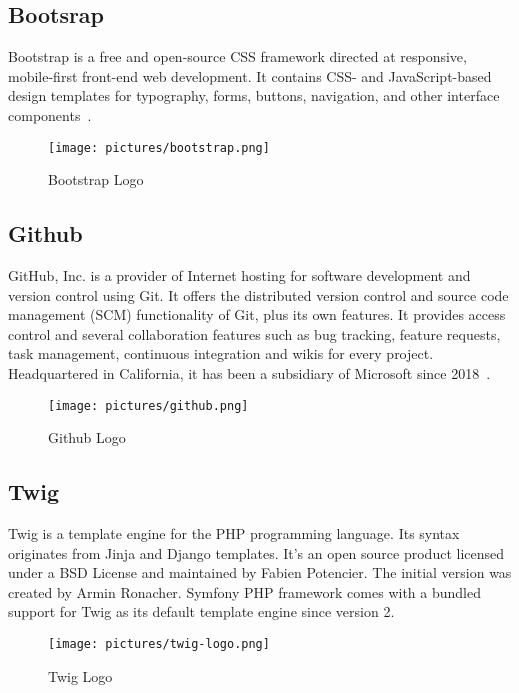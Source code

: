 \documentclass[12pt]{report}
\begin{document}
\subsection{Bootsrap}
Bootstrap is a free and open-source CSS framework directed at responsive, mobile-first front-end web development. It contains CSS- and JavaScript-based design templates for typography, forms, buttons, navigation, and other interface components~\cite{hesterberg2011bootstrap}.
\begin{figure}[!htbp]

        \centering
    \texttt{[image: pictures/bootstrap.png]}
    \caption{Bootstrap Logo}
    \label{fig:bootstrap}
\end{figure}

\subsection{Github}
GitHub, Inc. is a provider of Internet hosting for software development and version control using Git. It offers the distributed version control and source code management (SCM) functionality of Git, plus its own features. It provides access control and several collaboration features such as bug tracking, feature requests, task management, continuous integration and wikis for every project. Headquartered in California, it has been a subsidiary of Microsoft since 2018~\cite{github}.
\begin{figure}[!htbp]

        \centering
    \texttt{[image: pictures/github.png]}
    \caption{Github Logo}
    \label{fig:github}
\end{figure}

\subsection{Twig}
Twig is a template engine for the PHP programming language. Its syntax originates from Jinja and Django templates. It's an open source product licensed under a BSD License and maintained by Fabien Potencier. The initial version was created by Armin Ronacher. Symfony PHP framework comes with a bundled support for Twig as its default template engine since version 2.
\begin{figure}[!htbp]

        \centering
    \texttt{[image: pictures/twig-logo.png]}
    \caption{Twig Logo}
    \label{fig:twig}
\end{figure}
\end{document}
